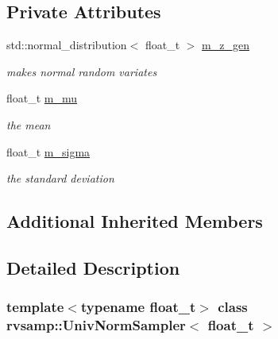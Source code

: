 \subsection*{Private Attributes}
\begin{DoxyCompactItemize}
\item 
\mbox{\label{classrvsamp_1_1UnivNormSampler_a5c40c8154c9585acb70c9a487764806e}} 
std\+::normal\+\_\+distribution$<$ float\+\_\+t $>$ \hyperlink{classrvsamp_1_1UnivNormSampler_a5c40c8154c9585acb70c9a487764806e}{m\+\_\+z\+\_\+gen}
\begin{DoxyCompactList}\small\item\em makes normal random variates \end{DoxyCompactList}\item 
\mbox{\label{classrvsamp_1_1UnivNormSampler_a62483bf974fc36d79ff38aa81755e645}} 
float\+\_\+t \hyperlink{classrvsamp_1_1UnivNormSampler_a62483bf974fc36d79ff38aa81755e645}{m\+\_\+mu}
\begin{DoxyCompactList}\small\item\em the mean \end{DoxyCompactList}\item 
\mbox{\label{classrvsamp_1_1UnivNormSampler_a5ecc2ae8d9b2c25f070467651cf4f0d2}} 
float\+\_\+t \hyperlink{classrvsamp_1_1UnivNormSampler_a5ecc2ae8d9b2c25f070467651cf4f0d2}{m\+\_\+sigma}
\begin{DoxyCompactList}\small\item\em the standard deviation \end{DoxyCompactList}\end{DoxyCompactItemize}
\subsection*{Additional Inherited Members}


\subsection{Detailed Description}
\subsubsection*{template$<$typename float\+\_\+t$>$\newline
class rvsamp\+::\+Univ\+Norm\+Sampler$<$ float\+\_\+t $>$}

